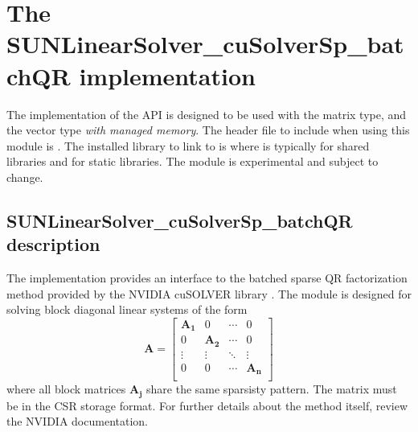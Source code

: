 \section{The SUNLinearSolver\_cuSolverSp\_batchQR implementation}\label{ss:sunlinsol_cuspbqr}

The  implementation of the {\sunlinsol} API is
designed to be used with the {\sunmatsparse} matrix type, and the {\nveccuda} vector type
\textit{with managed memory}. The header file to include when using this module is
. The installed library to link to
is  where  is typically
 for shared libraries and  for static libraries.
\newline
\newline
{\warn} The  module is experimental and subject to change.

\subsection{SUNLinearSolver\_cuSolverSp\_batchQR description}\label{ss:sunlinsol_cuspbqr_description}

The  implementation provides an interface to
the batched sparse QR factorization method provided by the NVIDIA cuSOLVER library
\cite{cuSOLVER_site}. The module is designed for solving block diagonal linear systems
of the form
\begin{equation*}
  \mathbf{A} =
  \begin{bmatrix}
    \mathbf{A_1} & 0 & \cdots & 0\\
    0 & \mathbf{A_2} & \cdots & 0\\
    \vdots & \vdots & \ddots & \vdots\\
    0 & 0 & \cdots & \mathbf{A_n}\\
  \end{bmatrix}
\end{equation*}
where all block matrices $\mathbf{A_j}$ share the same sparsisty pattern. The matrix
must be in the CSR storage format. For further details about the method itself,
review the NVIDIA documentation.


